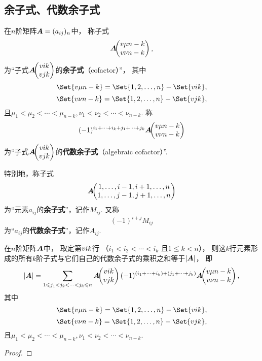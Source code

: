 \subsection{余子式、代数余子式}
\begin{definition}
在\(n\)阶矩阵\(\boldsymbol{A}=(a_{ij})_n\)中，
称子式\[
	\boldsymbol{A}\kern-3.8pt\begin{pmatrix}
		v{\mu}{n-k} \\
		v{\nu}{n-k}
	\end{pmatrix},
\]为“子式\(\boldsymbol{A}\kern-3.8pt\begin{pmatrix}
	v{i}{k} \\
	v{j}{k}
\end{pmatrix}\)的\textbf{余子式}（cofactor）”，
其中\[
	\Set{ \v{\mu}{n-k} } = \Set{ 1,2,\dotsc,n } - \Set{ \v{i}{k} },
\]\[
	\Set{ \v{\nu}{n-k} } = \Set{ 1,2,\dotsc,n } - \Set{ \v{j}{k} },
\]
且\(\mu_1<\mu_2<\dotsb<\mu_{n-k},
\nu_1<\nu_2<\dotsb<\nu_{n-k}\).
称\[
	(-1)^{i_1+\dotsb+i_k+j_1+\dotsb+j_k}
	\boldsymbol{A}\kern-3.8pt\begin{pmatrix}
		v{\mu}{n-k} \\
		v{\nu}{n-k}
	\end{pmatrix}
\]为“子式\(\boldsymbol{A}\kern-3.8pt\begin{pmatrix}
	v{i}{k} \\
	v{j}{k}
\end{pmatrix}\)的\textbf{代数余子式}（algebraic cofactor）”.

特别地，称子式\[
	\boldsymbol{A}\kern-3.8pt\begin{pmatrix}
		1,\dotsc,i-1,i+1,\dotsc,n \\
		1,\dotsc,j-1,j+1,\dotsc,n
	\end{pmatrix}
\]为“元素\(a_{ij}\)的\textbf{余子式}”，记作\(M_{ij}\).
又称\[
(-1)^{i+j} M_{ij}
\]为“\(a_{ij}\)的\textbf{代数余子式}”，记作\(A_{ij}\).
\end{definition}

\begin{theorem}[拉普拉斯定理]\label{theorem:行列式.拉普拉斯定理}
在\(n\)阶矩阵\(\boldsymbol{A}\)中，
取定第\(v{i}{k}\)行
（\(i_1<i_2<\dotsb<i_k\)
且\(1 \leqslant k < n\)），
则这\(k\)行元素形成的所有\(k\)阶子式与它们自己的代数余子式的乘积之和等于\(\abs{\boldsymbol{A}}\)，%
即\begin{equation}
	\abs{\boldsymbol{A}} =
	\sum\limits_{1 \leqslant j_1 < j_2 < \dotsb < j_k \leqslant n}
	\boldsymbol{A}\kern-3.8pt\begin{pmatrix}
		v{i}{k} \\
		v{j}{k}
	\end{pmatrix}
	(-1)^{(i_1+\dotsb+i_k)+(j_1+\dotsb+j_k)}
	\boldsymbol{A}\kern-3.8pt\begin{pmatrix}
		v{\mu}{n-k} \\
		v{\nu}{n-k}
	\end{pmatrix},
\end{equation}
其中\[
	\Set{ \v{\mu}{n-k} } = \Set{ 1,2,\dotsc,n } - \Set{ \v{i}{k} },
\]\[
	\Set{ \v{\nu}{n-k} } = \Set{ 1,2,\dotsc,n } - \Set{ \v{j}{k} },
\]
且\(\mu_1<\mu_2<\dotsb<\mu_{n-k},
\nu_1<\nu_2<\dotsb<\nu_{n-k}\).
\begin{proof}

\end{proof}
\end{theorem}

